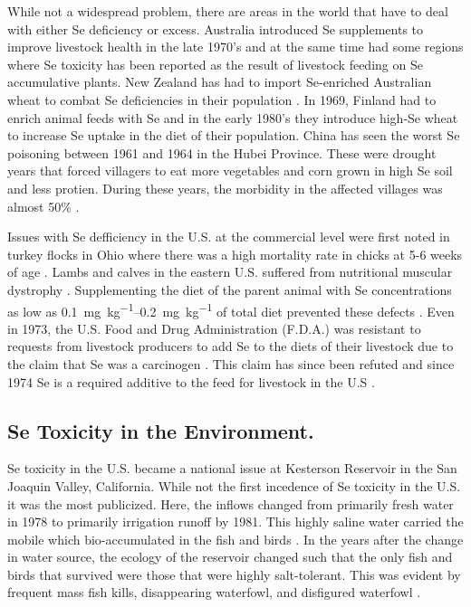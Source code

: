 \begin{linenumbers}[1]
While not a widespread problem, there are areas in the world that have to deal with either Se deficiency or excess.  Australia introduced Se supplements to improve livestock health in the late 1970's and at the same time had some regions where Se toxicity has been reported as the result of livestock feeding on Se accumulative plants.  New Zealand has had to import Se-enriched Australian wheat to combat Se deficiencies in their population \parencite{1996Thomson,Tinggi2003}.  In 1969, Finland had to enrich animal feeds with Se and in the early 1980's they introduce high-Se wheat to increase Se uptake in the diet of their population.  China has seen the worst Se poisoning between 1961 and 1964 in the Hubei Province.  These were drought years that forced villagers to eat more vegetables and corn grown in high Se soil and less protien.  During these years, the morbidity in the affected villages was almost 50\% \parencite{yang1983}.

Issues with Se defficiency in the U.S. at the commercial level were first noted in turkey flocks in Ohio where there was a high mortality rate in chicks at 5-6 weeks of age \parencite{scott1967}.  Lambs and calves in the eastern U.S. suffered from nutritional muscular dystrophy .  Supplementing the diet of the parent animal with Se concentrations as low as \SIrange{0.1}{0.2}{\milli\gram\per\kilo\gram} of total diet prevented these defects .  Even in 1973, the U.S. Food and Drug Administration (F.D.A.) was resistant to requests from livestock producers to add Se to the diets of their livestock due to the claim that Se was a carcinogen \parencite{scott1973}.  This claim has since been refuted and since 1974 Se is a required additive to the feed for livestock in the U.S \parencite{1999Jensen}.

\subsection*{Se Toxicity in the Environment.}
Se toxicity in the U.S. became a national issue at Kesterson Reservoir in the San Joaquin Valley, California.  While not the first incedence of Se toxicity in the U.S. it was the most publicized.  Here, the inflows changed from primarily fresh water in 1978 to primarily irrigation runoff by 1981.  This highly saline water carried the mobile \selenate which bio-accumulated in the fish and birds \parencite{Besser1989}.  In the years after the change in water source, the ecology of the reservoir changed such that the only fish and birds that survived were those that were highly salt-tolerant.  This was evident by frequent mass fish kills, disappearing waterfowl, and disfigured waterfowl \parencite{Clifton1989,Saiki1993,Hamilton1999,Lemly2002}.


\end{linenumbers}
